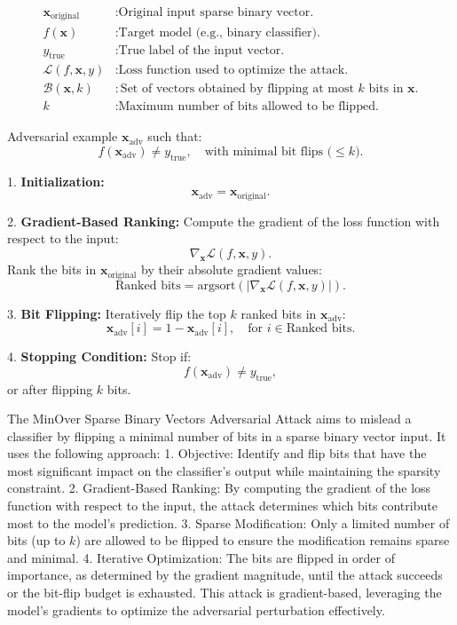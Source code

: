 \[
\begin{aligned}
\mathbf{x}_{\text{original}} & : \text{Original input sparse binary vector.} \\
f(\mathbf{x}) & : \text{Target model (e.g., binary classifier).} \\
y_{\text{true}} & : \text{True label of the input vector.} \\
\mathcal{L}(f, \mathbf{x}, y) & : \text{Loss function used to optimize the attack.} \\
\mathcal{B}(\mathbf{x}, k) & : \text{Set of vectors obtained by flipping at most $k$ bits in $\mathbf{x}$.} \\
k & : \text{Maximum number of bits allowed to be flipped.}
\end{aligned}
\]

Adversarial example $\mathbf{x}_{\text{adv}}$ such that:
\[
f(\mathbf{x}_{\text{adv}}) \neq y_{\text{true}}, \quad \text{with minimal bit flips ($\leq k$)}.
\]

1. \textbf{Initialization:}
   \[
   \mathbf{x}_{\text{adv}} = \mathbf{x}_{\text{original}}.
   \]

2. \textbf{Gradient-Based Ranking:}
   Compute the gradient of the loss function with respect to the input:
   \[
   \nabla_{\mathbf{x}} \mathcal{L}(f, \mathbf{x}, y).
   \]
   Rank the bits in $\mathbf{x}_{\text{original}}$ by their absolute gradient values:
   \[
   \text{Ranked bits} = \text{argsort}(|\nabla_{\mathbf{x}} \mathcal{L}(f, \mathbf{x}, y)|).
   \]

3. \textbf{Bit Flipping:}
   Iteratively flip the top $k$ ranked bits in $\mathbf{x}_{\text{adv}}$:
   \[
   \mathbf{x}_{\text{adv}}[i] = 1 - \mathbf{x}_{\text{adv}}[i], \quad \text{for } i \in \text{Ranked bits}.
   \]

4. \textbf{Stopping Condition:}
   Stop if:
   \[
   f(\mathbf{x}_{\text{adv}}) \neq y_{\text{true}},
   \]
   or after flipping $k$ bits.

The MinOver Sparse Binary Vectors Adversarial Attack aims to mislead a classifier by flipping a minimal number of bits in a sparse binary vector input. It uses the following approach:
1. Objective: Identify and flip bits that have the most significant impact on the classifier's output while maintaining the sparsity constraint.
2. Gradient-Based Ranking: By computing the gradient of the loss function with respect to the input, the attack determines which bits contribute most to the model's prediction. 
3. Sparse Modification: Only a limited number of bits (up to $k$) are allowed to be flipped to ensure the modification remains sparse and minimal.
4. Iterative Optimization: The bits are flipped in order of importance, as determined by the gradient magnitude, until the attack succeeds or the bit-flip budget is exhausted.
This attack is gradient-based, leveraging the model's gradients to optimize the adversarial perturbation effectively.

